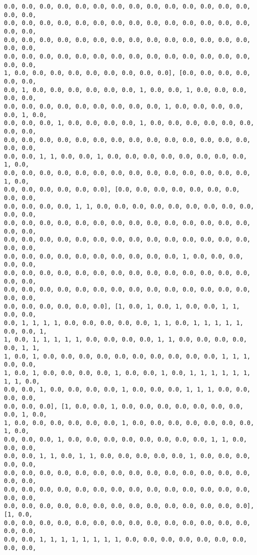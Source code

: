 \documentclass[11pt]{article}
\begin{document}
\begin{Verbatim}[commandchars=\\\{\}]
0.0, 0.0, 0.0, 0.0, 0.0, 0.0, 0.0, 0.0, 0.0, 0.0, 0.0, 0.0, 0.0, 0.0, 0.0, 0.0,
0.0, 0.0, 0.0, 0.0, 0.0, 0.0, 0.0, 0.0, 0.0, 0.0, 0.0, 0.0, 0.0, 0.0, 0.0, 0.0,
0.0, 0.0, 0.0, 0.0, 0.0, 0.0, 0.0, 0.0, 0.0, 0.0, 0.0, 0.0, 0.0, 0.0, 0.0, 0.0,
0.0, 0.0, 0.0, 0.0, 0.0, 0.0, 0.0, 0.0, 0.0, 0.0, 0.0, 0.0, 0.0, 0.0, 0.0, 0.0,
1, 0.0, 0.0, 0.0, 0.0, 0.0, 0.0, 0.0, 0.0, 0.0], [0.0, 0.0, 0.0, 0.0, 0.0, 0.0,
0.0, 1, 0.0, 0.0, 0.0, 0.0, 0.0, 0.0, 1, 0.0, 0.0, 1, 0.0, 0.0, 0.0, 0.0, 0.0,
0.0, 0.0, 0.0, 0.0, 0.0, 0.0, 0.0, 0.0, 0.0, 1, 0.0, 0.0, 0.0, 0.0, 0.0, 1, 0.0,
0.0, 0.0, 0.0, 1, 0.0, 0.0, 0.0, 0.0, 1, 0.0, 0.0, 0.0, 0.0, 0.0, 0.0, 0.0, 0.0,
0.0, 0.0, 0.0, 0.0, 0.0, 0.0, 0.0, 0.0, 0.0, 0.0, 0.0, 0.0, 0.0, 0.0, 0.0, 0.0,
0.0, 0.0, 1, 1, 0.0, 0.0, 1, 0.0, 0.0, 0.0, 0.0, 0.0, 0.0, 0.0, 0.0, 1, 0.0,
0.0, 0.0, 0.0, 0.0, 0.0, 0.0, 0.0, 0.0, 0.0, 0.0, 0.0, 0.0, 0.0, 0.0, 1, 0.0,
0.0, 0.0, 0.0, 0.0, 0.0, 0.0], [0.0, 0.0, 0.0, 0.0, 0.0, 0.0, 0.0, 0.0, 0.0,
0.0, 0.0, 0.0, 0.0, 1, 1, 0.0, 0.0, 0.0, 0.0, 0.0, 0.0, 0.0, 0.0, 0.0, 0.0, 0.0,
0.0, 0.0, 0.0, 0.0, 0.0, 0.0, 0.0, 0.0, 0.0, 0.0, 0.0, 0.0, 0.0, 0.0, 0.0, 0.0,
0.0, 0.0, 0.0, 0.0, 0.0, 0.0, 0.0, 0.0, 0.0, 0.0, 0.0, 0.0, 0.0, 0.0, 0.0, 0.0,
0.0, 0.0, 0.0, 0.0, 0.0, 0.0, 0.0, 0.0, 0.0, 0.0, 1, 0.0, 0.0, 0.0, 0.0, 0.0,
0.0, 0.0, 0.0, 0.0, 0.0, 0.0, 0.0, 0.0, 0.0, 0.0, 0.0, 0.0, 0.0, 0.0, 0.0, 0.0,
0.0, 0.0, 0.0, 0.0, 0.0, 0.0, 0.0, 0.0, 0.0, 0.0, 0.0, 0.0, 0.0, 0.0, 0.0, 0.0,
0.0, 0.0, 0.0, 0.0, 0.0, 0.0], [1, 0.0, 1, 0.0, 1, 0.0, 0.0, 1, 1, 0.0, 0.0,
0.0, 1, 1, 1, 1, 0.0, 0.0, 0.0, 0.0, 0.0, 1, 1, 0.0, 1, 1, 1, 1, 1, 0.0, 0.0, 1,
1, 0.0, 1, 1, 1, 1, 1, 0.0, 0.0, 0.0, 0.0, 1, 1, 0.0, 0.0, 0.0, 0.0, 0.0, 1, 1,
1, 0.0, 1, 0.0, 0.0, 0.0, 0.0, 0.0, 0.0, 0.0, 0.0, 0.0, 0.0, 1, 1, 1, 0.0, 0.0,
1, 0.0, 1, 0.0, 0.0, 0.0, 0.0, 1, 0.0, 0.0, 1, 0.0, 1, 1, 1, 1, 1, 1, 1, 1, 0.0,
0.0, 0.0, 1, 0.0, 0.0, 0.0, 0.0, 1, 0.0, 0.0, 0.0, 1, 1, 1, 0.0, 0.0, 0.0, 0.0,
0.0, 0.0, 0.0], [1, 0.0, 0.0, 1, 0.0, 0.0, 0.0, 0.0, 0.0, 0.0, 0.0, 0.0, 1, 0.0,
1, 0.0, 0.0, 0.0, 0.0, 0.0, 0.0, 1, 0.0, 0.0, 0.0, 0.0, 0.0, 0.0, 0.0, 1, 0.0,
0.0, 0.0, 0.0, 1, 0.0, 0.0, 0.0, 0.0, 0.0, 0.0, 0.0, 0.0, 1, 1, 0.0, 0.0, 0.0,
0.0, 0.0, 1, 1, 0.0, 1, 1, 0.0, 0.0, 0.0, 0.0, 0.0, 1, 0.0, 0.0, 0.0, 0.0, 0.0,
0.0, 0.0, 0.0, 0.0, 0.0, 0.0, 0.0, 0.0, 0.0, 0.0, 0.0, 0.0, 0.0, 0.0, 0.0, 0.0,
0.0, 0.0, 0.0, 0.0, 0.0, 0.0, 0.0, 0.0, 0.0, 0.0, 0.0, 0.0, 0.0, 0.0, 0.0, 0.0,
0.0, 0.0, 0.0, 0.0, 0.0, 0.0, 0.0, 0.0, 0.0, 0.0, 0.0, 0.0, 0.0, 0.0], [1, 0.0,
0.0, 0.0, 0.0, 0.0, 0.0, 0.0, 0.0, 0.0, 0.0, 0.0, 0.0, 0.0, 0.0, 0.0, 0.0, 0.0,
0.0, 0.0, 1, 1, 1, 1, 1, 1, 1, 1, 0.0, 0.0, 0.0, 0.0, 0.0, 0.0, 0.0, 0.0, 0.0,

\end{Verbatim}
\end{document}
